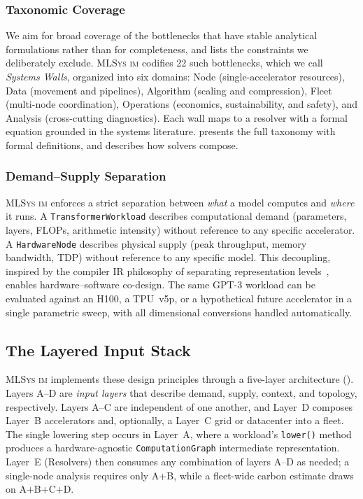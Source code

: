 \documentclass[10pt,twocolumn]{article}
\newcommand{\mlsysim}{\mbox{\textsc{MLSys}\,\textperiodcentered\,\textsc{im}}\xspace}
\begin{document}
\subsubsection{Taxonomic Coverage}
\label{sec:taxonomic}

We aim for broad coverage of the bottlenecks that have stable analytical formulations rather than for completeness, and  lists the constraints we deliberately exclude. \mlsysim codifies 22 such bottlenecks, which we call \emph{Systems Walls}, organized into six domains: Node (single-accelerator resources), Data (movement and pipelines), Algorithm (scaling and compression), Fleet (multi-node coordination), Operations (economics, sustainability, and safety), and Analysis (cross-cutting diagnostics). Each wall maps to a resolver with a formal equation grounded in the systems literature.  presents the full taxonomy with formal definitions, and  describes how solvers compose.

\subsubsection{Demand--Supply Separation}
\label{sec:demand-supply}

\mlsysim enforces a strict separation between \emph{what} a model computes and \emph{where} it runs. A \texttt{TransformerWorkload} describes computational demand (parameters, layers, FLOPs, arithmetic intensity) without reference to any specific accelerator. A \texttt{HardwareNode} describes physical supply (peak throughput, memory bandwidth, TDP) without reference to any specific model. This decoupling, inspired by the compiler IR philosophy of separating representation levels~\citep{hennessy2024architecture}, enables hardware--software co-design. The same GPT-3 workload can be evaluated against an H100, a TPU~v5p, or a hypothetical future accelerator in a single parametric sweep, with all dimensional conversions handled automatically.

\subsection{The Layered Input Stack}
\label{sec:stack}

\mlsysim implements these design principles through a five-layer architecture (). Layers A--D are \emph{input layers} that describe demand, supply, context, and topology, respectively. Layers A--C are independent of one another, and Layer~D composes Layer~B accelerators and, optionally, a Layer~C grid or datacenter into a fleet.  The single lowering step occurs in Layer~A, where a workload's \texttt{lower()} method produces a hardware-agnostic \texttt{ComputationGraph} intermediate representation.  Layer~E (Resolvers) then consumes any combination of layers A--D as needed; a single-node analysis requires only A+B, while a fleet-wide carbon estimate draws on A+B+C+D.
\end{document}
